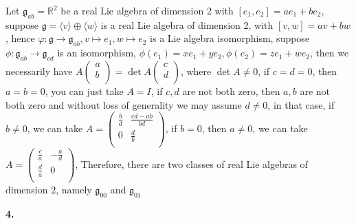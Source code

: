 \documentclass[10pt]{article}
\newcommand{\<}[1]{\langle #1 \rangle}
\begin{document}
Let $\mathfrak{g}_{ab}=\mathbb{R}^2$ be a real Lie algebra of dimension 2 with $[e_1,e_2]=ae_1+be_2$, suppose $\mathfrak{g}=\<{v}\oplus\<{w}$ is a real Lie algebra of dimension 2, with $[v,w]=av+bw$, hence $\varphi:\mathfrak{g}\rightarrow\mathfrak{g}_{ab},v\mapsto e_1,w\mapsto e_2$ is a Lie algebra isomorphism, suppose $\phi:\mathfrak{g}_{ab}\rightarrow\mathfrak{g}_{cd}$ is an isomorphism, $\phi(e_1)=xe_1+ye_2, \phi(e_2)=ze_1+we_2$, then we necessarily have $A\left( {\begin{array}{c}
a \\
b \\
\end{array} } \right)=\det A \left( {\begin{array}{c}
c \\
d \\
\end{array} } \right)$, where $\det A\neq0$, if $c=d=0$, then $a=b=0$, you can just take $A=I$, if $c,d$ are not both zero, then $a,b$ are not both zero and without loss of generality we may assume $d\neq0$, in that case, if $b\neq0$, we can take $A=\left( {\begin{array}{cc}
\frac{b}{d} & \frac{cd-ab}{bd} \\
0 & \frac{d}{b} \\
\end{array} } \right)$, if $b=0$, then $a\neq0$, we can take $A=\left( {\begin{array}{cc}
\frac{c}{a} & -\frac{a}{d} \\
\frac{d}{a} & 0 \\
\end{array} } \right)$, Therefore, there are two classes of real Lie algebras of dimension 2, namely $\mathfrak{g}_{00}$ and $\mathfrak{g}_{01}$ \par
\textbf{4.} \par
\end{document}
